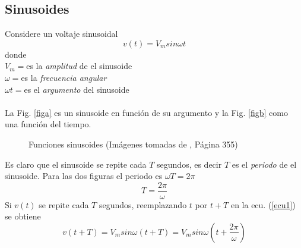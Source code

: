 \documentclass[twocolumn]{IEEEtran}
\begin{document}
\subsection{Sinusoides}
\noindent
Considere un voltaje sinusoidal
\begin{equation}
 v(t) = V_{m} sin \omega t
\label{ecu1}
\end{equation}
\noindent
donde\\
$V_m = $es la \textit{amplitud} de el sinusoide\\
$\omega = $es la \textit{frecuencia angular}\\
$\omega t = $es el \textit{argumento} del sinusoide\\\\
La Fig. \ref{figa} es un sinusoide en función de su argumento y la Fig. \ref{figb} como una función del tiempo.
\begin{figure}[H]
  \centering
  \hspace{2cm}
  \caption{Funciones sinusoides (Imágenes tomadas de \cite{sadiku}, Página 355)}
    \label{fig1}
\end{figure}
\noindent
Es claro que el sinusoide se repite cada $T$ segundos, es decir $T$ es el \textit{periodo} de el sinusoide. Para las dos figuras el periodo es $\omega T = 2 \pi$
\begin{equation}
 T= \frac{2 \pi}{\omega}
\label{ecu2}
\end{equation}
\noindent
Si $v(t)$ se repite cada $T$ segundos, reemplazando $t$ por $t + T$ en la ecu. (\ref{ecu1}) se obtiene
\begin{equation}
 v(t+T) = V_{m} sin \omega (t + T) = V_{m} sin \omega (t + \frac{2 \pi}{\omega})
\label{ecu3}
\end{equation}
\end{document}
